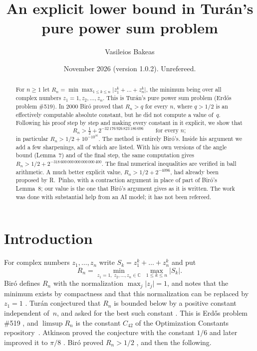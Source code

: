 \documentclass[11pt]{amsart}
\theoremstyle{remark}
\theoremstyle{plain}
\newcommand{\abs}[1]{\lvert #1\rvert}
\newcommand{\NO}{32\,176\,926\,823\,186\,696}
\newcommand{\NI}{318\,600\,000\,000\,000\,000\,400}
\begin{document}
\title{An explicit lower bound in Tur\'an's pure power sum problem}

\author{Vasileios Bakeas}
\address{Department of Mechanical Engineering, University of Thessaly, Volos, Greece}

\date{November 2026 (version 1.0.2). Unrefereed.}


\begin{abstract}
For $n\ge 1$ let $R_n=\min\max_{1\le k\le n}\abs{z_1^k+\dots+z_n^k}$, the minimum being over all complex numbers $z_1=1,z_2,\dots,z_n$. This is Tur\'an's pure power sum problem (Erd\H{o}s problem \#519). In 2000 Bir\'o proved that $R_n>q$ for every $n$, where $q>1/2$ is an effectively computable absolute constant, but he did not compute a value of~$q$. Following his proof step by step and making every constant in it explicit, we show that
\[
R_n>\tfrac12+2^{-\NO}\qquad\text{for every } n;
\]
in particular $R_n>1/2+10^{-10^{16}}$. The method is entirely Bir\'o's. Inside his argument we add a few sharpenings, all of which are listed. With his own versions of the angle bound (Lemma~7) and of the final step, the same computation gives $R_n>1/2+2^{-\NI}$. The final numerical inequalities are verified in ball arithmetic. A much better explicit value, $R_n>1/2+2^{-4096}$, had already been proposed by R.~Pinho, with a contraction argument in place of part of Bir\'o's Lemma~8; our value is the one that Bir\'o's argument gives as it is written. The work was done with substantial help from an AI model; it has not been refereed.
\end{abstract}

\maketitle

\section{Introduction}\label{sec:intro}

For complex numbers $z_1,\dots,z_n$ write $S_k=z_1^k+\dots+z_n^k$ and put
\[
  R_n=\min_{z_1=1,\;z_2,\dots,z_n\in\mathbb C}\ \max_{1\le k\le n}\abs{S_k}.
\]
Bir\'o defines $R_n$ with the normalization $\max_j\abs{z_j}=1$, and notes that the minimum exists by compactness and that this normalization can be replaced by $z_1=1$ \cite[\S1]{Bir00b}. Tur\'an conjectured that $R_n$ is bounded below by a positive constant independent of~$n$, and asked for the best such constant \cite{Tur84}. This is Erd\H{o}s problem \#519 \cite{Blo}, and $\limsup R_n$ is the constant $C_{42}$ of the Optimization Constants repository~\cite{Tao}. Atkinson proved the conjecture with the constant $1/6$ \cite{Atk61} and later improved it to $\pi/8$ \cite{Atk69}. Bir\'o proved $R_n>1/2$ \cite{Bir94}, and then the following.
\end{document}
